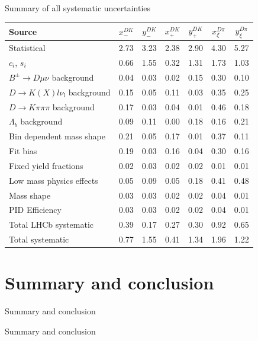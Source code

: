 \documentclass{beamer}
\begin{document}
\begin{frame}{Summary of all systematic uncertainties}
  \begin{tabular}{lcccccc} 
        \hline
        Source & $x_-^{DK}$ & $y_-^{DK}$ & $x_+^{DK}$ & $y_+^{DK}$ & $x_\xi^{D\pi}$ & $y_\xi^{D\pi}$ \\
        \hline
        Statistical                              & 2.73  & 3.23  & 2.38  & 2.90  & 4.30  & 5.27  \\
        \hline
        $c_i$, $s_i$                             & 0.66  & 1.55  & 0.32  & 1.31  & 1.73  & 1.03  \\
        \hline
        $B^\pm\to D\mu\nu$ background            & 0.04  & 0.03  & 0.02  & 0.15  & 0.30  & 0.10 \\
        $D\to K(X)l\nu_l$ background             & 0.15  & 0.05  & 0.11  & 0.03  & 0.35  & 0.25 \\
        $D\to K\pi\pi\pi$ background             & 0.17  & 0.03  & 0.04  & 0.01  & 0.46  & 0.18 \\
        $\Lambda_b$ background                   & 0.09  & 0.11  & 0.00  & 0.18  & 0.16  & 0.21 \\
        Bin dependent mass shape                 & 0.21  & 0.05  & 0.17  & 0.01  & 0.37  & 0.11 \\
        Fit bias                                 & 0.19  & 0.03  & 0.16  & 0.04  & 0.30  & 0.16 \\
        Fixed yield fractions                    & 0.02  & 0.03  & 0.02  & 0.02  & 0.01  & 0.01 \\
        Low mass physics effects                 & 0.05  & 0.09  & 0.05  & 0.18  & 0.41  & 0.48 \\
        Mass shape                               & 0.03  & 0.03  & 0.02  & 0.02  & 0.04  & 0.01 \\
        PID Efficiency                           & 0.03  & 0.03  & 0.02  & 0.02  & 0.04  & 0.01 \\
        \hline
        Total LHCb systematic                    & 0.39  & 0.17  & 0.27  & 0.30  & 0.92  & 0.65  \\
        \hline
        Total systematic                         & 0.77  & 1.55  & 0.41  & 1.34  & 1.96  & 1.22  \\
        \hline
  \end{tabular}
\end{frame}

\section{Summary and conclusion}
\begin{frame}{Summary and conclusion}
  \begin{center}
    {\huge Summary and conclusion}
  \end{center}
\end{frame}
\end{document}
